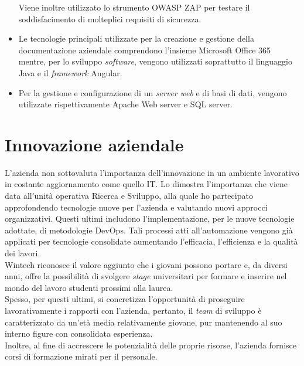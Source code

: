 \begin{itemize}
    Viene inoltre utilizzato lo strumento OWASP ZAP per testare il soddisfacimento di molteplici requisiti di sicurezza. 
    \item Le tecnologie principali utilizzate per la creazione e gestione della documentazione aziendale comprendono l'insieme Microsoft Office 365 mentre, per lo sviluppo \emph{software}, vengono utilizzati soprattutto il linguaggio Java e il \emph{framework} Angular. 
    \item Per la gestione e configurazione di un \emph{server web} e di basi di dati, vengono utilizzate rispettivamente Apache Web server e SQL server. 
\end{itemize}

\section{Innovazione aziendale}
L'azienda non sottovaluta l'importanza dell'innovazione in un ambiente lavorativo in costante aggiornamento come quello \gls{IT}. Lo dimostra l'importanza che viene data all'\gls{unità operativa} Ricerca e Sviluppo, alla quale ho partecipato approfondendo tecnologie nuove per l'azienda e valutando nuovi approcci organizzativi. Questi ultimi includono l'implementazione, per le nuove tecnologie adottate, di metodologie \gls{DevOps}. Tali processi atti all'automazione vengono già applicati per tecnologie consolidate aumentando l'efficacia, l'efficienza e la qualità dei lavori.\\
Wintech riconosce il valore aggiunto che i giovani possono portare e, da diversi anni, offre la possibilità di svolgere \emph{stage} universitari per formare e inserire nel mondo del lavoro studenti prossimi alla laurea.\\
Spesso, per questi ultimi, si concretizza l'opportunità di proseguire lavorativamente i rapporti con l'azienda, pertanto, il \emph{team} di sviluppo è caratterizzato da un'età media relativamente giovane, pur mantenendo al suo interno figure con consolidata esperienza.\\ 
Inoltre, al fine di accrescere le potenzialità delle proprie risorse, l'azienda fornisce corsi di formazione mirati per il personale.
